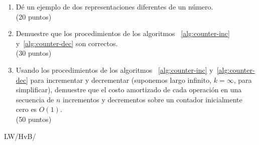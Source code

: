 \documentclass[english, spanish, fleqn]{article}
\begin{document}
  \begin{enumerate}
  \item %
    Dé un ejemplo de dos representaciones diferentes de un número.
    \\ \hspace*{\fill}(20 puntos)
  \item %
    Demuestre que los procedimientos de los algoritmos~%
    \ref{alg:counter-inc} y~\ref{alg:counter-dec}
    son correctos.
    \\ \hspace*{\fill}(30 puntos)
  \item %
    Usando los procedimientos de los algoritmos~%
    \ref{alg:counter-inc} y~\ref{alg:counter-dec}
    para incrementar y decrementar
    (suponemos largo infinito, \(k = \infty\), para simplificar),
    demuestre que el costo amortizado de cada operación
    en una secuencia de \(n\) incrementos y decrementos
    sobre un contador inicialmente cero es \(O(1)\).
    \\ \hspace*{\fill}(50 puntos)
  \end{enumerate}


  \vfill\hfill LW/HvB/\LaTeXe
\end{document}
